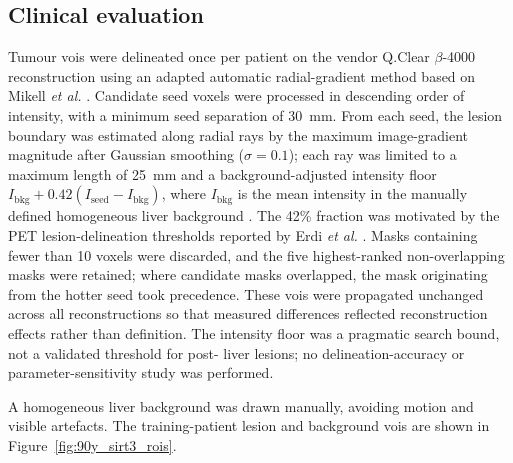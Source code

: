 \subsection{Clinical evaluation}
\label{subsec:90y_clinical_eval}

Tumour \glspl{voi} were delineated once per patient on the vendor Q.Clear
$\beta$-4000  reconstruction using an adapted automatic
radial-gradient method based on Mikell \textit{et al.}
\cite{mikellImpact90YPET2018}. Candidate seed voxels were processed in
descending order of intensity, with a minimum seed separation of
\SI{30}{\milli\metre}. From each seed, the lesion boundary was estimated along
radial rays by the maximum image-gradient magnitude after Gaussian smoothing
($\sigma=0.1$); each ray was limited to a
maximum length of \SI{25}{\milli\metre} and a background-adjusted intensity
floor $I_{\mathrm{bkg}}+0.42(I_{\mathrm{seed}}-I_{\mathrm{bkg}})$, where
$I_{\mathrm{bkg}}$ is the mean intensity in the manually defined homogeneous
liver background . The 42\% fraction was motivated by the
PET lesion-delineation thresholds reported by Erdi \textit{et al.}
\cite{erdiSegmentationLungLesion1997}. Masks containing fewer than 10 voxels
were discarded, and the five highest-ranked non-overlapping masks were
retained; where candidate masks overlapped, the mask originating from the
hotter seed took precedence. These \glspl{voi} were propagated unchanged
across all reconstructions so that measured differences reflected
reconstruction effects rather than  definition. The intensity
floor was a pragmatic search bound, not a validated threshold for
post- liver lesions; no delineation-accuracy or
parameter-sensitivity study was performed.

A homogeneous liver background  was drawn manually,
avoiding motion and visible artefacts. The training-patient lesion and
background \glspl{voi} are shown in Figure~\ref{fig:90y_sirt3_rois}.

